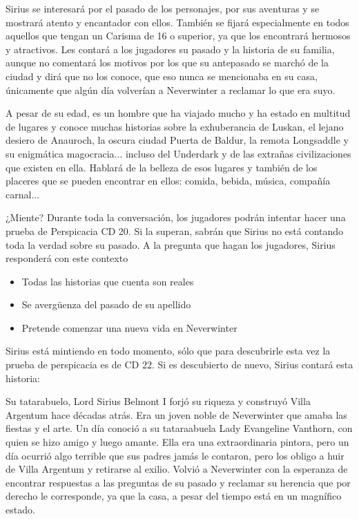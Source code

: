 \documentclass[10pt,twoside,twocolumn,openany]{dndbook}
\begin{document}
Sirius se interesará por el pasado de los personajes, por sus aventuras y se mostrará atento y 
encantador con ellos. También se fijará especialmente en todos aquellos que tengan un Carisma 
de 16 o superior, ya que los encontrará hermosos y atractivos. Les contará a los jugadores su 
pasado y la historia de su familia, aunque no comentará los motivos por los que su antepasado 
se marchó de la ciudad y dirá que no los conoce, que eso nunca se mencionaba en su casa, 
únicamente que algún día volverían a Neverwinter a reclamar lo que era suyo.

A pesar de su edad, es un hombre que ha viajado mucho y ha estado en multitud de lugares y conoce 
muchas historias sobre la exhuberancia de Luskan, el lejano desiero de Anauroch, la oscura ciudad
Puerta de Baldur, la remota Longsaddle y su enigmática magocracia... incluso del Underdark y de
las extrañas civilizaciones que existen en ella. Hablará de la belleza de esos lugares y también 
de los placeres que se pueden encontrar en ellos: comida, bebida, música, compañía carnal... 

\begin{DndComment}{¿Miente?}
  Durante toda la conversación, los jugadores podrán intentar hacer una prueba de Perspicacia CD 20. 
  Si la superan, sabrán que Sirius no está contando toda la verdad sobre su pasado. A la pregunta
  que hagan los jugadores, Sirius responderá con este contexto

\begin{itemize}
  \item Todas las historias que cuenta son reales
  \item Se avergüenza del pasado de su apellido
  \item Pretende comenzar una nueva vida en Neverwinter
\end{itemize}
\end{DndComment}

Sirius está mintiendo en todo momento, sólo que para descubrirle esta vez la prueba de perspicacia es de 
CD 22. Si es descubierto de nuevo, Sirius contará esta historia:

\begin{DndReadAloud}
Su tatarabuelo, Lord Sirius Belmont I forjó su riqueza y construyó Villa Argentum hace décadas atrás.
Era un joven noble de Neverwinter que amaba las fiestas y el arte. Un día conoció a su tataraabuela
Lady Evangeline Vanthorn, con quien se hizo amigo y luego amante. Ella era una extraordinaria 
pintora, pero un día ocurrió algo terrible que sus padres jamás le contaron, pero los obligo
a huir de Villa Argentum y retirarse al exilio. Volvió a Neverwinter con la esperanza de encontrar
respuestas a las preguntas de su pasado y reclamar su herencia que por derecho le corresponde, ya
que la casa, a pesar del tiempo está en un magnífico estado.
\end{DndReadAloud}
\end{document}
